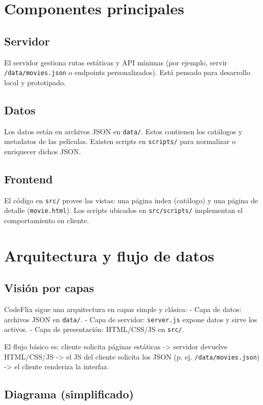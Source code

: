 \documentclass[11pt,a4paper]{article}
\begin{document}
\section{Componentes principales}
\subsection{Servidor}
El servidor gestiona rutas estáticas y API mínimas (por ejemplo, servir \texttt{/data/movies.json} o endpoints personalizados). Está pensado para desarrollo local y prototipado.

\subsection{Datos}
Los datos están en archivos JSON en \texttt{data/}. Estos contienen los catálogos y metadatos de las películas. Existen scripts en \texttt{scripts/} para normalizar o enriquecer dichos JSON.

\subsection{Frontend}
El código en \texttt{src/} provee las vistas: una página index (catálogo) y una página de detalle (\texttt{movie.html}). Los scripts ubicados en \texttt{src/scripts/} implementan el comportamiento en cliente.

\section{Arquitectura y flujo de datos}
\subsection{Visión por capas}
CodeFlix sigue una arquitectura en capas simple y clásica:
- Capa de datos: archivos JSON en \texttt{data/}. 
- Capa de servidor: \texttt{server.js} expone datos y sirve los activos. 
- Capa de presentación: HTML/CSS/JS en \texttt{src/}. 

El flujo básico es: cliente solicita páginas estáticas -> servidor devuelve HTML/CSS/JS -> el JS del cliente solicita los JSON (p. ej. \texttt{/data/movies.json}) -> el cliente renderiza la interfaz.

\subsection{Diagrama (simplificado)}
\begin{center}
\end{center}
\end{document}
